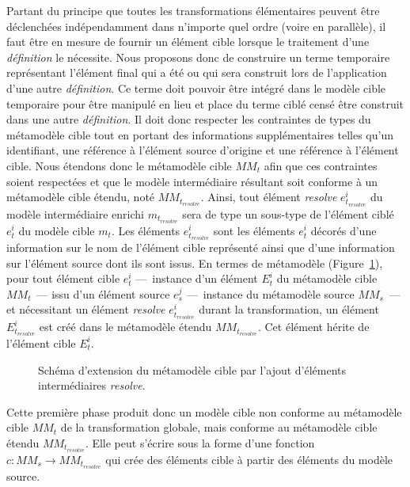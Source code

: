 Partant du principe que toutes les transformations élémentaires peuvent être
déclenchées indépendamment dans n'importe quel ordre (voire en parallèle), il
faut être en mesure de fournir un élément cible lorsque le traitement d'une
\emph{définition} le nécessite. Nous proposons donc de construire un terme
temporaire représentant l'élément final qui a été ou qui sera construit lors de
l'application d'une autre \emph{définition}. Ce terme doit pouvoir être intégré
dans le modèle cible temporaire pour être manipulé en lieu et place du terme
ciblé censé être construit dans une autre \emph{définition}. Il doit donc
respecter les contraintes de types du métamodèle cible tout en portant des
informations supplémentaires telles qu'un identifiant, une référence à
l'élément source d'origine et une référence à l'élément cible. Nous étendons
donc le métamodèle cible $MM_t$ afin que ces contraintes soient respectées et
que le modèle intermédiaire résultant soit conforme à un métamodèle cible
étendu, noté $MM_{t_{resolve}}$. Ainsi, tout élément \emph{resolve}
$e_{t_{resolve}}^i$ du modèle intermédiaire enrichi $m_{t_{resolve}}$ sera de
type un sous-type de l'élément ciblé $e_t^i$ du modèle cible $m_t$. Les
éléments $e_{t_{resolve}}^i$ sont les éléments $e_t^i$ décorés d'une
information sur le nom de l'élément cible représenté ainsi que d'une
information sur l'élément source dont ils sont issus. En termes de métamodèle
(Figure~\ref{fig:mmresolve}), pour tout élément cible $e_t^i$ ---~instance d'un
élément $E_t^i$ du métamodèle cible $MM_t$~--- issu d'un élément source $e_s^j$
---~instance du métamodèle source $MM_s$~--- et nécessitant un élément
\emph{resolve} $e_{t_{resolve}}^i$ durant la transformation, un élément
$E_{t_{resolve}}^i$ est créé dans le métamodèle étendu $MM_{t_{resolve}}$. Cet
élément hérite de l'élément cible $E_t^i$.\\

\begin{figure}[h]
  \begin{center}
    
    \caption{Schéma d'extension du métamodèle cible par l'ajout d'éléments intermédiaires \emph{resolve}.}
    \label{fig:mmresolve}
  \end{center}
\end{figure}
Cette première phase produit donc un modèle cible non conforme au métamodèle
cible $MM_t$ de la transformation globale, mais conforme au métamodèle cible
étendu $MM_{t_{resolve}}$. Elle peut s'écrire sous la forme d'une fonction $c: MM_s
\rightarrow MM_{t_{resolve}}$ qui crée des éléments cible à partir des éléments
du modèle source.

